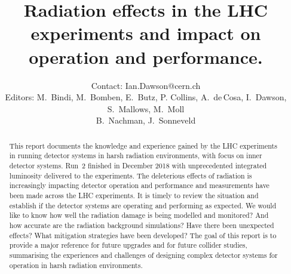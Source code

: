 \documentclass{cernrep}
\begin{document}
\title{Radiation effects in the LHC experiments and impact on operation and performance.}

\author {Contact: Ian.Dawson@cern.ch \\
Editors: M.~Bindi, M.~Bomben, E.~Butz, P. Collins, A.~de\,Cosa, I.~Dawson, S.~Mallows, M.~Moll \\
B.~Nachman, J.~Sonneveld}

\begin{abstract}
This report documents the knowledge and experience gained by the LHC experiments in running detector systems in harsh radiation environments, with focus on inner detector systems. Run~2 finished in December 2018 with unprecedented integrated luminosity delivered to the experiments. The deleterious effects of radiation is increasingly impacting detector operation and performance and measurements have been made across the LHC experiments. It is timely to review the situation and establish if the detector systems are operating and performing as expected. We would like to know how well the radiation damage is being modelled and monitored? And how accurate are the radiation background simulations? Have there been unexpected effects? What mitigation strategies have been developed? The goal of this report is to provide a major reference for future upgrades and for future collider studies, summarising the experiences and challenges of designing complex detector systems for operation in harsh radiation environments. 
\end{abstract}


\maketitle %
  
\tableofcontents











\end{document}
